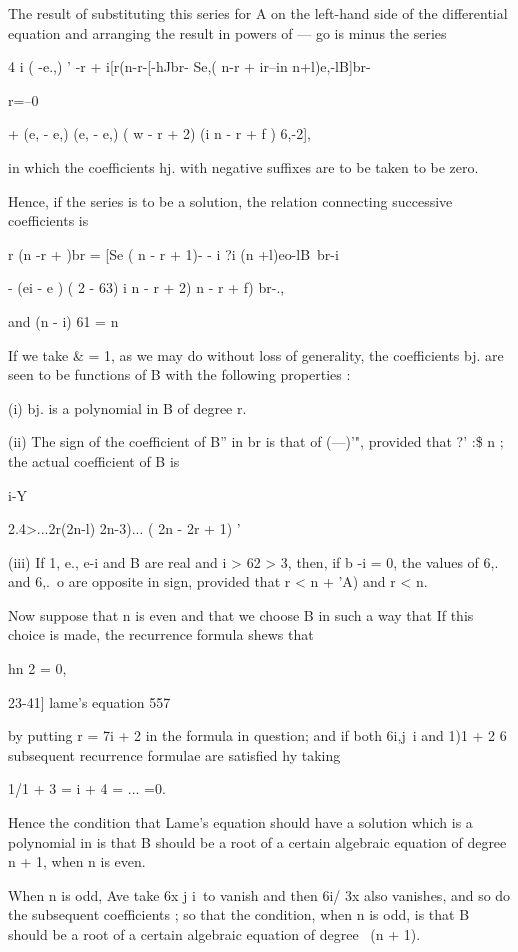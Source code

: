 {{{{The result of substituting this series for A on the left-hand side of
the differential equation and arranging the result in powers of — go
is minus the series

4 i ( -e.,) ' -r + i[r(n-r-[-hJbr- Se,( n-r + ir--in n+l)e,-lB]br-

r=--0

+ (e, - e,) (e, - e,) ( w - r + 2) (i n - r + f ) 6,-2],

in which the coefficients hj. with negative suffixes are to be taken
to be zero.

Hence, if the series is to be a solution, the relation connecting
successive coefficients is

r (n -r + )br = [Se ( n - r + 1)- - i ?i (n +l)eo-lB\ br-i

- (ei - e ) ( 2 - 63) i n - r + 2) n - r + f) br-.,

and (n - i) 61 = n%

If we take \& = 1, as we may do without loss of generality, the
coefficients bj. are seen to be functions of B with the following
properties :

(i) bj. is a polynomial in B of degree r.

(ii) The sign of the coefficient of B'' in br is that of (—)'",
provided that ?' :\$ n ; the actual coefficient of B is

i-Y



2.4>...2r(2n-l) 2n-3)... ( 2n - 2r + 1) '

(iii) If 1, e., e-i and B are real and i > 62 > 3, then, if b -i = 0,
the values of 6,. and 6,.\ o are opposite in sign, provided that r < n
+ 'A) and r < n.

Now suppose that n is even and that we choose B in such a way that If
this choice is made, the recurrence formula shews that

hn 2 = 0,



23-41] lame's equation 557

by putting r = 7i + 2 in the formula in question; and if both 6i,j\ i
and 1)1 + 2 6 subsequent recurrence formulae are satisfied hy taking

 1/1 + 3 = i + 4 = ... =0.

Hence the condition that Lame's equation should have a solution which
is a polynomial in is that B should be a root of a certain algebraic
equation of degree n + 1, when n is even.

When n is odd, Ave take 6x j i\ to vanish and then 6i/ 3x also
vanishes, and so do the subsequent coefficients ; so that the
condition, when n is odd, is that B should be a root of a certain
algebraic equation of degree \ (n + 1).

}}}}
